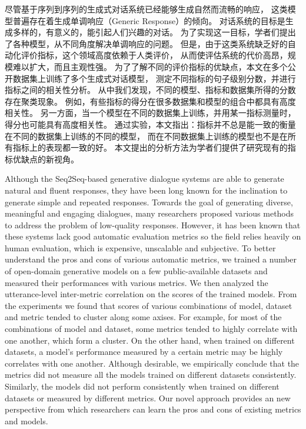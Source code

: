 
\begin{cabstract}
    尽管基于序列到序列的生成式对话系统已经能够生成自然而流畅的响应，
    这类模型普遍存在着生成单调响应（Generic Response）的倾向。
    对话系统的目标是生成多样的，有意义的，能引起人们兴趣的对话。
    为了实现这一目标，学者们提出了各种模型，从不同角度解决单调响应的问题。
    但是，由于这类系统缺乏好的自动化评价指标，这个领域高度依赖于人类评价，
    从而使评估系统的代价高昂，规模难以扩大，而且主观性强。
    为了了解不同的评价指标的优缺点，本文在多个公开数据集上训练了多个生成式对话模型，
    测定不同指标的句子级别分数，并进行指标之间的相关性分析。
    从中我们发现，不同的模型、指标和数据集所得的分数存在聚类现象。
    例如，有些指标的得分在很多数据集和模型的组合中都具有高度相关性。
    另一方面，当一个模型在不同的数据集上训练，并用某一指标测量时，得分也可能具有高度相关性。
    通过实验，本文指出：指标并不总是能一致的衡量在不同的数据集上训练的不同的模型，
    而在不同数据集上训练的模型也不是在所有指标上的表现都一致的好。
    本文提出的分析方法为学者们提供了研究现有的指标优缺点的新视角。
\end{cabstract}

\begin{eabstract}
    Although the Seq2Seq-based generative dialogue systems are able to generate natural and
    fluent responses,
    they have been long known for the inclination to generate simple and repeated responses.
    Towards the goal of generating diverse, meaningful and engaging dialogues,
    many researchers proposed various methods to address the problem of low-quality responses.
    However, it has been known that these systems lack good automatic evaluation metrics
    so the field relies heavily on human evaluation, which is expensive, unscalable and subjective.
    To better understand the pros and cons of various automatic metrics,
    we trained a number of open-domain generative models on
    a few public-available datasets and measured their performances with various metrics.
    We then analyzed the utterance-level inter-metric correlation on the scores of the trained models.
    From the experiments we found that scores of various combinations of model, dataset and metric
    tended to cluster along some axises.
    For example, for most of the combinations of model and dataset, some metrics tended to highly
    correlate with one another, which form a cluster.
    On the other hand, when trained on different datasets, a model's performance measured by a certain
    metric may be highly correlates with one another.
    Although desirable, we empirically conclude that the metrics did not measure all the models trained
    on different datasets consistently.
    Similarly, the models did not perform consistently when trained on different datasets or measured
    by different metrics. Our novel approach provides an new perspective from which researchers
    can learn the pros and cons of existing metrics and models.
\end{eabstract}
